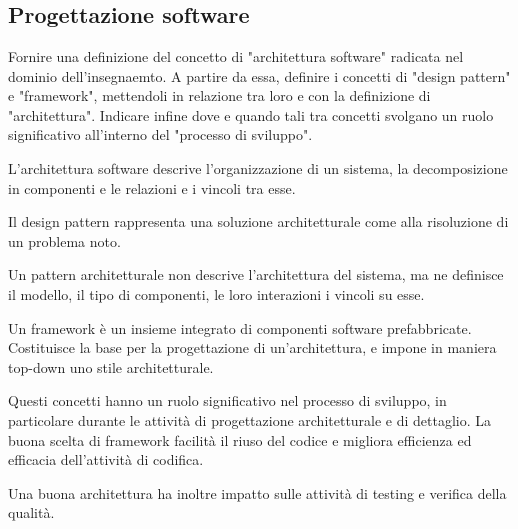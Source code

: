 \section{}

\subsection{Progettazione software}

\begin{question}
  Fornire una definizione del concetto di "architettura software" radicata nel
  dominio dell'insegnaemto. A partire da essa, definire i concetti di "design
  pattern" e "framework", mettendoli in relazione tra loro e con la
  definizione di "architettura". Indicare infine dove e quando tali tra concetti
  svolgano un ruolo significativo all'interno del "processo di sviluppo".
\end{question}

L'architettura software descrive l'organizzazione di un sistema, la
decomposizione in componenti e le relazioni e i vincoli tra esse.

Il design pattern rappresenta una soluzione architetturale come  alla risoluzione di un problema noto.

Un pattern architetturale non descrive l'architettura del sistema, ma ne
definisce il modello, il tipo di componenti, le loro interazioni i vincoli su
esse.

Un framework è un insieme integrato di componenti software prefabbricate.
Costituisce la base per la progettazione  di
un'architettura, e impone in maniera top-down uno stile architetturale.

Questi concetti hanno un ruolo significativo nel processo di sviluppo, in
particolare durante le attività di progettazione architetturale e di dettaglio.
La buona scelta di framework facilità il riuso del codice e migliora
efficienza ed efficacia dell'attività di codifica.

Una buona architettura ha inoltre impatto sulle attività di testing e verifica
della qualità.
